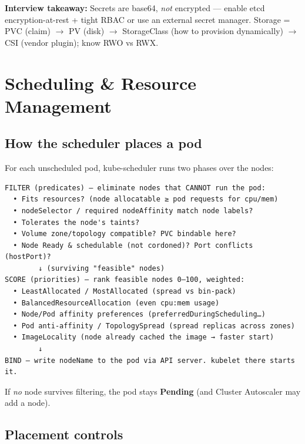 \documentclass[11pt]{article}
\begin{document}
\textbf{Interview takeaway:} Secrets are base64, \emph{not} encrypted --- enable etcd encryption-at-rest + tight RBAC or use an external secret manager. Storage = PVC (claim) \(\rightarrow\) PV (disk) \(\rightarrow\) StorageClass (how to provision dynamically) \(\rightarrow\) CSI (vendor plugin); know RWO vs RWX.

\section{Scheduling \& Resource Management}\label{scheduling--resource-management}

\subsection{How the scheduler places a pod}\label{how-the-scheduler-places-a-pod}

For each unscheduled pod, kube-scheduler runs two phases over the nodes:

\setcodelang{}

\begin{verbatim}
FILTER (predicates) — eliminate nodes that CANNOT run the pod:
  • Fits resources? (node allocatable ≥ pod requests for cpu/mem)
  • nodeSelector / required nodeAffinity match node labels?
  • Tolerates the node's taints?
  • Volume zone/topology compatible? PVC bindable here?
  • Node Ready & schedulable (not cordoned)? Port conflicts (hostPort)?
        ↓ (surviving "feasible" nodes)
SCORE (priorities) — rank feasible nodes 0–100, weighted:
  • LeastAllocated / MostAllocated (spread vs bin-pack)
  • BalancedResourceAllocation (even cpu:mem usage)
  • Node/Pod affinity preferences (preferredDuringScheduling…)
  • Pod anti-affinity / TopologySpread (spread replicas across zones)
  • ImageLocality (node already cached the image → faster start)
        ↓
BIND — write nodeName to the pod via API server. kubelet there starts it.
\end{verbatim}

If \emph{no} node survives filtering, the pod stays \textbf{Pending} (and Cluster Autoscaler may add a node).

\subsection{Placement controls}\label{placement-controls}
\end{document}
